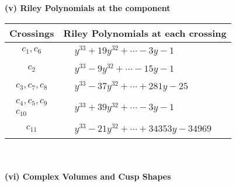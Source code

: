\documentclass[1p]{elsarticle_modified}
\theoremstyle{definition}
\begin{document}
\newpage\renewcommand{\arraystretch}{1}
\flushleft \textbf{(v) Riley Polynomials at the component}\newline \\
\begin{tabular}{m{50pt}|m{274pt}}
Crossings & \hspace{64pt}Riley Polynomials at each crossing \\
\hline $$\begin{aligned}c_{1},c_{6}\end{aligned}$$&$\begin{aligned}
&y^{33}+19 y^{32}+\cdots-3 y-1
\end{aligned}$\\
\hline $$\begin{aligned}c_{2}\end{aligned}$$&$\begin{aligned}
&y^{33}-9 y^{32}+\cdots-15 y-1
\end{aligned}$\\
\hline $$\begin{aligned}c_{3},c_{7},c_{8}\end{aligned}$$&$\begin{aligned}
&y^{33}-37 y^{32}+\cdots+281 y-25
\end{aligned}$\\
\hline $$\begin{aligned}c_{4},c_{5},c_{9}\\c_{10}\end{aligned}$$&$\begin{aligned}
&y^{33}+39 y^{32}+\cdots-3 y-1
\end{aligned}$\\
\hline $$\begin{aligned}c_{11}\end{aligned}$$&$\begin{aligned}
&y^{33}-21 y^{32}+\cdots+34353 y-34969
\end{aligned}$\\
\hline
\end{tabular}\\~\\
\newpage\flushleft \textbf{(vi) Complex Volumes and Cusp Shapes}
\end{document}
